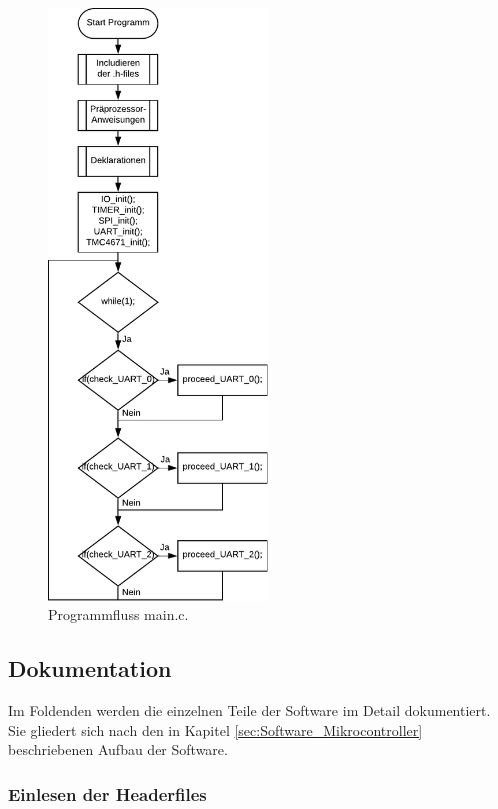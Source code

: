 \newpage
\begin{figure}[h!]
	\centering	
	\includegraphics[width=0.52\textwidth]{graphics/Programmfluss_P5.pdf}
	\caption{Programmfluss main.c.} 
	\label{fig:Software_Programmflussdiagramm}
\end{figure}

\newpage


\subsection{Dokumentation}\label{subsec:Software_Dokumentation}

Im Foldenden werden die einzelnen Teile der Software im Detail dokumentiert. Sie gliedert sich nach den in Kapitel \ref{sec:Software_Mikrocontroller} beschriebenen Aufbau der Software.

\subsubsection{Einlesen der Headerfiles}\label{subsubsec:Einlesen_Headerfiles}

